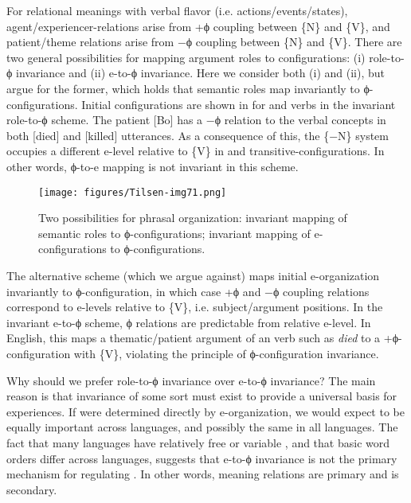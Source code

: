 For relational meanings with verbal flavor (i.e. actions/events/states), agent/ex\-pe\-ri\-en\-cer-relations arise from +ϕ coupling between \{N\} and \{V\}, and patient/theme relations arise from −ϕ coupling between \{N\} and \{V\}. There are two general possibilities for mapping argument roles to configurations: (i) role-to-ϕ invariance and (ii) e-to-ϕ invariance. Here we consider both (i) and (ii), but argue for the former, which holds that semantic roles map invariantly to ϕ-configurations. Initial configurations are shown in {} for  and  verbs in the invariant role-to-ϕ scheme. The patient [Bo] has a −ϕ relation to the verbal concepts in both  [died] and  [killed] utterances. As a consequence of this, the \{−N\} system occupies a different e-level relative to \{V\} in  and transitive-configurations. In other words, ϕ-to-e mapping is not invariant in this scheme.

  
\begin{figure}
\texttt{[image: figures/Tilsen-img71.png]}
\caption{Two possibilities for phrasal organization: invariant mapping of semantic roles to ϕ-configurations; invariant mapping of e-configurations to ϕ-configurations.}
\label{fig:4:21}
\end{figure}
 

  The alternative scheme (which we argue against) maps initial e-organization invariantly to ϕ-configuration, in which case +ϕ and −ϕ coupling relations correspond to e-levels relative to \{V\}, i.e. subject/argument positions. In the invariant e-to-ϕ scheme, ϕ relations are predictable from relative e-level. In English, this maps a thematic/patient argument of an  verb such as \textit{died} to a +ϕ-configuration with \{V\}, violating the principle of ϕ-configuration invariance.\largerpage[2]

  Why should we prefer role-to-ϕ invariance over e-to-ϕ invariance? The main reason is that invariance of some sort must exist to provide a universal basis for  experiences. If  were determined directly by e-organization, we would expect  to be equally important across languages, and possibly the same in all languages. The fact that many languages have relatively free or variable , and that basic word orders differ across languages, suggests that e-to-ϕ invariance is not the primary mechanism for regulating . In other words, meaning relations are primary and  is secondary.

